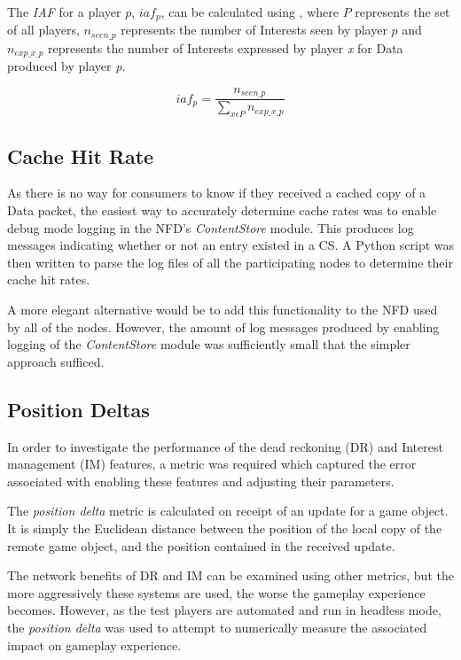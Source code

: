 The \textit{IAF} for a player $p$, $iaf_p$, can be calculated using , where $P$ represents the set of all players, $n_{seen\_p}$ represents the number of Interests seen by player $p$ and $n_{exp\_x\_p}$ represents the number of Interests expressed by player \textit{x} for Data produced by player \textit{p}.

\begin{equation}\label{eq:impl:iaf}
    iaf_p = \frac{n_{seen\_p}}{\sum\limits_{x \epsilon P}^{}{n_{exp\_x\_p}}}
\end{equation}


\subsection{Cache Hit Rate}
As there is no way for consumers to know if they received a cached copy of a Data packet, the easiest way to accurately determine cache rates was to enable debug mode logging in the NFD's \textit{ContentStore} module. This produces log messages indicating whether or not an entry existed in a CS. A Python script was then written to parse the log files of all the participating nodes to determine their cache hit rates.

A more elegant alternative would be to add this functionality to the NFD used by all of the nodes. However, the amount of log messages produced by enabling logging of the \textit{ContentStore} module was sufficiently small that the simpler approach sufficed.

\subsection{Position Deltas}
In order to investigate the performance of the dead reckoning (DR) and Interest management (IM) features, a metric was required which captured the error associated with enabling these features and adjusting their parameters.

The \textit{position delta} metric is calculated on receipt of an update for a game object. It is simply the Euclidean distance between the position of the local copy of the remote game object, and the position contained in the received update. 

The network benefits of DR and IM can be examined using other metrics, but the more aggressively these systems are used, the worse the gameplay experience becomes. However, as the test players are automated and run in headless mode, the \textit{position delta} was used to attempt to numerically measure the associated impact on gameplay experience.


